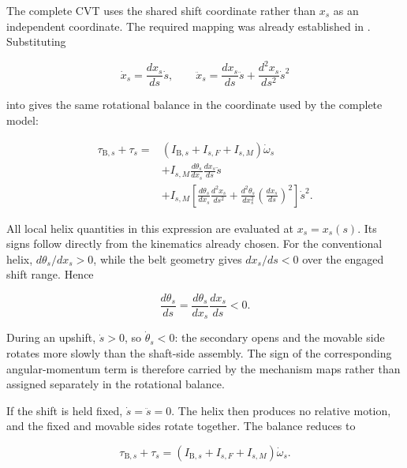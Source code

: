 \documentclass[11pt]{report}
\numberwithin{equation}{section}
\begin{document}
The complete CVT uses the shared shift coordinate rather than \(x_s\) as an
independent coordinate. The required mapping was already established in
. Substituting

\[
    \dot x_s
    =
    \frac{dx_s}{ds}\dot s,
    \qquad
    \ddot x_s
    =
    \frac{dx_s}{ds}\ddot s
    +
    \frac{d^2x_s}{ds^2}\dot s^2
\]

into  gives the same rotational
balance in the coordinate used by the complete model:

\begin{equation}
\begin{aligned}
    \tau_{\mathrm{B},s}
    +
    \tau_s
    ={}&
    \left(
        I_{\mathrm{B},s}
        +
        I_{s,F}
        +
        I_{s,M}
    \right)
    \dot\omega_s
    \\
    &+
    I_{s,M}
    \frac{d\theta_s}{dx_s}
    \frac{dx_s}{ds}
    \ddot s
    \\
    &+
    I_{s,M}
    \left[
        \frac{d\theta_s}{dx_s}
        \frac{d^2x_s}{ds^2}
        +
        \frac{d^2\theta_s}{dx_s^2}
        \left(\frac{dx_s}{ds}\right)^2
    \right]
    \dot s^2.
\end{aligned}
    \label{eq:secondary_rotational_eom_belt}
\end{equation}

All local helix quantities in this expression are evaluated at
\(x_s=x_s(s)\). Its signs follow directly from the kinematics already chosen.
For the conventional helix,
\(d\theta_s/dx_s>0\), while the belt geometry gives \(dx_s/ds<0\) over the
engaged shift range. Hence

\[
    \frac{d\theta_s}{ds}
    =
    \frac{d\theta_s}{dx_s}
    \frac{dx_s}{ds}
    <0.
\]

During an upshift, \(\dot s>0\), so \(\dot\theta_s<0\): the secondary opens
and the movable side rotates more slowly than the shaft-side assembly. The
sign of the corresponding angular-momentum term is therefore carried by the
mechanism maps rather than assigned separately in the rotational balance.

If the shift is held fixed, \(\dot s=\ddot s=0\). The helix then produces no
relative motion, and the fixed and movable sides rotate together. The balance
reduces to

\begin{equation}
    \tau_{\mathrm{B},s}
    +
    \tau_s
    =
    \left(
        I_{\mathrm{B},s}
        +
        I_{s,F}
        +
        I_{s,M}
    \right)
    \dot\omega_s.
    \label{eq:secondary_rotational_fixed_configuration_limit}
\end{equation}
\end{document}
